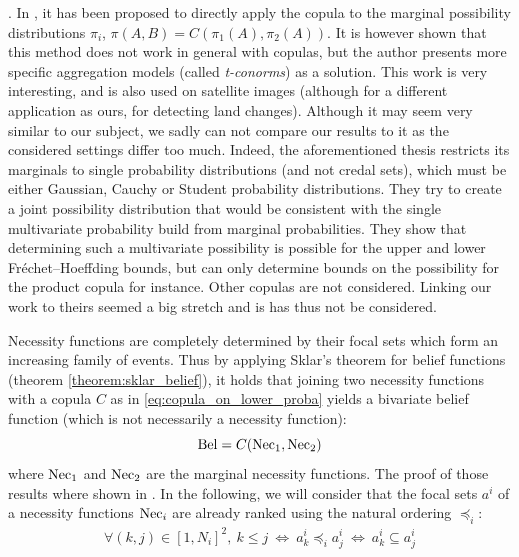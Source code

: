 \begin{remark}
    . In  \cite{lesniewska-choquet_specialite_2020}, it has been proposed to directly apply the copula to the marginal possibility distributions $\pi_i$, \ie $\pi(A,B)=C(\pi_1(A), \pi_2(A))$. It is however shown that this method does not work in general with copulas, but the author presents more specific aggregation models (called \textit{t-conorms}) as a solution. This work is very interesting, and is also used on satellite images (although for a different application as ours, \ie for detecting land changes). Although it may seem very similar to our subject, we sadly can not compare our results to it as the considered settings differ too much. Indeed, the aforementioned thesis restricts its marginals to single probability distributions (and not credal sets), which must be either Gaussian, Cauchy or Student probability distributions. They try to create a joint possibility distribution that would be consistent with the single multivariate probability build from marginal probabilities. They show that determining such a multivariate possibility is possible for the upper and lower Fréchet–Hoeffding bounds, but can only determine bounds on the possibility for the product copula for instance. Other copulas are not considered. Linking our work to theirs seemed a big stretch and is has thus not be considered. 
\end{remark}

Necessity functions are completely determined by their focal sets which form an increasing family of events. Thus by applying Sklar's theorem for belief functions (theorem \ref{theorem:sklar_belief}), it holds that joining two necessity functions with a copula $C$ as in \eqref{eq:copula_on_lower_proba} yields a bivariate belief function (which is not necessarily a necessity function):
\begin{equation}
    \mathrm{Bel} = C(\mathrm{Nec}_1, \mathrm{Nec}_2)\label{eq:sklar_on_necessity}
\end{equation}
where $\mathrm{Nec}_1$ and $\mathrm{Nec}_2$ are the marginal necessity functions. The proof of those results where shown in \cite{schmelzer_joint_2015,schmelzer_sklars_2015}. In the following, we will consider that the focal sets $a^i$ of a necessity functions $\mathrm{Nec}_i$ are already ranked using the natural ordering $\preceq_i$:
\begin{eqnarray}
    \forall (k,j)\in[1, N_i]^2,~k\leqslant j ~\Leftrightarrow ~ a^i_k \preceq_i a^i_j ~\Leftrightarrow ~ a^i_k\subseteq a^i_j
\end{eqnarray}

